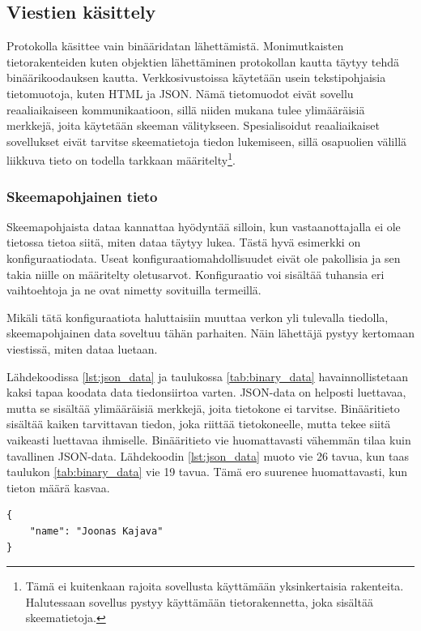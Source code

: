 \documentclass[a4paper,12pt]{article}
\begin{document}
    \subsection{Viestien käsittely}
    Protokolla käsittee vain binääridatan lähettämistä. Monimutkaisten tietorakenteiden kuten objektien lähettäminen protokollan kautta täytyy tehdä binäärikoodauksen kautta. Verkkosivustoissa käytetään usein tekstipohjaisia tietomuotoja, kuten HTML ja JSON. Nämä tietomuodot eivät sovellu reaaliaikaiseen kommunikaatioon, sillä niiden mukana tulee ylimääräisiä merkkejä, joita käytetään skeeman välitykseen. Spesialisoidut reaaliaikaiset sovellukset eivät tarvitse skeematietoja tiedon lukemiseen, sillä osapuolien välillä liikkuva tieto on todella tarkkaan määritelty\footnote{Tämä ei kuitenkaan rajoita sovellusta käyttämään yksinkertaisia rakenteita. Halutessaan sovellus pystyy käyttämään tietorakennetta, joka sisältää skeematietoja.}. \par

    \subsubsection{Skeemapohjainen tieto}
    Skeemapohjaista dataa kannattaa hyödyntää silloin, kun vastaanottajalla ei ole tietossa tietoa siitä, miten dataa täytyy lukea. Tästä hyvä esimerkki on konfiguraatiodata.
    Useat konfiguraatiomahdollisuudet eivät ole pakollisia ja sen takia niille on määritelty oletusarvot. Konfiguraatio voi sisältää tuhansia eri vaihtoehtoja ja ne ovat nimetty sovituilla termeillä. \par
    Mikäli tätä konfiguraatiota haluttaisiin muuttaa verkon yli tulevalla tiedolla, skeemapohjainen data soveltuu tähän parhaiten. Näin lähettäjä pystyy kertomaan viestissä, miten dataa luetaan.


    Lähdekoodissa \ref{lst:json_data} ja taulukossa \ref{tab:binary_data} havainnollistetaan kaksi tapaa koodata data tiedonsiirtoa varten. JSON-data on helposti luettavaa, mutta se sisältää ylimääräisiä merkkejä, joita tietokone ei tarvitse. Binääritieto sisältää kaiken tarvittavan tiedon, joka riittää tietokoneelle, mutta tekee siitä vaikeasti luettavaa ihmiselle. Binääritieto vie huomattavasti vähemmän tilaa kuin tavallinen JSON-data.
    Lähdekoodin \ref{lst:json_data} muoto vie 26 tavua, kun taas taulukon \ref{tab:binary_data} vie 19 tavua. Tämä ero suurenee huomattavasti, kun tieton määrä kasvaa. \par

    \begin{lstlisting}[caption={JSON-data}, label={lst:json_data}]
{
    "name": "Joonas Kajava"
}
    \end{lstlisting}
\end{document}
